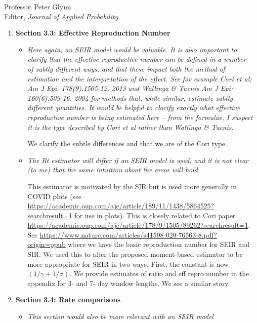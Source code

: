 \documentclass[11pt]{letter} %
\begin{document}
\begin{letter}{Professor
	Peter Glynn\\
	Editor, {\em Journal of Applied Probability}}
\begin{enumerate}
\begin{itemize}
	We now match the SEIR and still see the same thing for the ratio.
\end{itemize}
\item {\bf Section 3.3: Effective Reproduction Number}
\begin{itemize}
	\item {\it Here again, an SEIR model would be valuable. It is also important to clarify that the effective reproductive number can be defined in a number of subtly different ways, and that these impact both the method of estimation and the interpretation of the effect. See for example Cori et al; Am J Epi, 178(9):1505-12. 2013 and Wallinga \& Tuenis Am J Epi; 160(6):509-16. 2004 for methods that, while similar, estimate subtly different quantities. It would be helpful to clarify exactly what effective reproductive number is being estimated here – from the formulae, I suspect it is the type described by Cori et al rather than Wallinga \& Tuenis.}
	\vspace{5mm}

	We clarify the subtle differences and that we are of the Cori type.
	\vspace{5mm}
	\item {\it The Rt estimator will differ if an SEIR model is used, and it is not clear (to me) that the same intuition about the error will hold.}
	\vspace{5mm}

	This estimator is motivated by the SIR but is used more generally in COVID plots (see \href{here}{https://academic.oup.com/aje/article/189/11/1438/5864525?searchresult=1} for use in plots).  This is closely related to Cori paper \href{as reviewer identified}{https://academic.oup.com/aje/article/178/9/1505/89262?searchresult=1}.  See \href{here}{https://www.nature.com/articles/s41598-020-76563-8.pdf?origin=ppub} where we have the basic reproduction number for SEIR and SIR.  We used this to alter the proposed moment-based estimator to be more appropriate for SEIR in two ways.  First, the constant is now $(1/\gamma + 1/\sigma)$.  We provide estimates of ratio and eff repro number in the appendix for 3- and 7- day window lengths.  We see a similar story.
\end{itemize}
\item {\bf Section 3.4: Rate comparisons}
\begin{itemize}
	\item {\it This section would also be more relevant with an SEIR model}
	\vspace{5mm}


\end{itemize}
\end{enumerate}
\end{letter}
\end{document}
